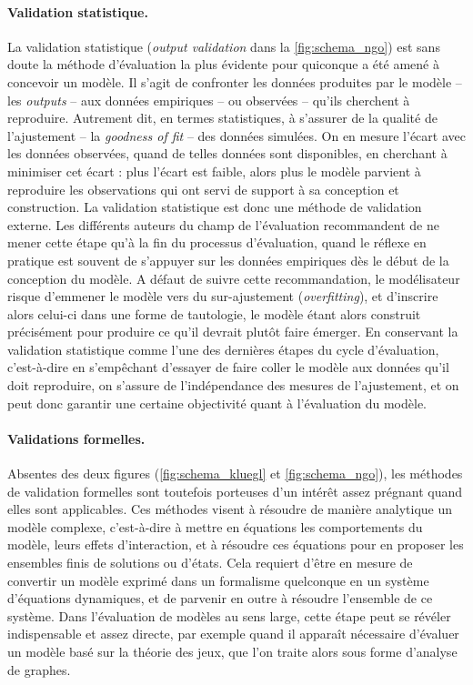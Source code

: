 \paragraph{Validation statistique.}
La validation statistique (\og \textit{output validation}\fg{} dans la \cref{fig:schema_ngo}) est sans doute la méthode d'évaluation la plus évidente pour quiconque a été amené à concevoir un modèle.
Il s'agit de confronter les données produites par le modèle -- les \textit{outputs} --
aux données empiriques -- ou observées -- qu'ils cherchent à reproduire.
Autrement dit, en termes statistiques, à s'assurer de la qualité de l'ajustement -- la \textit{goodness of fit} -- des données simulées.
On en mesure l'écart avec les données observées, quand de telles données sont disponibles, en cherchant à minimiser cet écart :
	plus l'écart est faible, alors plus le modèle parvient à reproduire les observations qui ont servi de support à sa conception et construction.
La validation statistique est donc une méthode de validation externe.
Les différents auteurs du champ de l'évaluation recommandent de ne mener cette étape qu'à la fin du processus d'évaluation, quand le réflexe en pratique est souvent de s'appuyer sur les données empiriques dès le début de la conception du modèle.
A défaut de suivre cette recommandation, le modélisateur risque d'emmener le modèle vers du \og sur-ajustement \fg{} (\textit{overfitting}), et d'inscrire alors celui-ci dans une forme de tautologie, le modèle étant alors construit précisément pour produire ce qu'il devrait plutôt faire émerger.
En conservant la validation statistique comme l'une des dernières étapes du cycle d'évaluation, c'est-à-dire en s'empêchant d'essayer de faire coller le modèle aux données qu'il doit reproduire, on s'assure de l'indépendance des mesures de l'ajustement, et on peut donc garantir une certaine objectivité quant à l'évaluation du modèle.

\paragraph{Validations formelles.}
Absentes des deux figures (\ref{fig:schema_kluegl} et \ref{fig:schema_ngo}), les méthodes de validation formelles sont toutefois porteuses d'un intérêt assez prégnant quand elles sont applicables.
Ces méthodes visent à résoudre de manière analytique un modèle complexe, c'est-à-dire à mettre en équations les comportements du modèle, leurs effets d'interaction, et à résoudre ces équations pour en proposer les ensembles finis de solutions ou d'états.
Cela requiert d'être en mesure de convertir un modèle exprimé dans un formalisme quelconque en un système d'équations dynamiques, et de parvenir en outre à résoudre l'ensemble de ce système.
Dans l'évaluation de modèles au sens large, cette étape peut se révéler indispensable et assez directe, par exemple quand il apparaît nécessaire d'évaluer un modèle basé sur la théorie des jeux, que l'on traite alors sous forme d'analyse de graphes.

